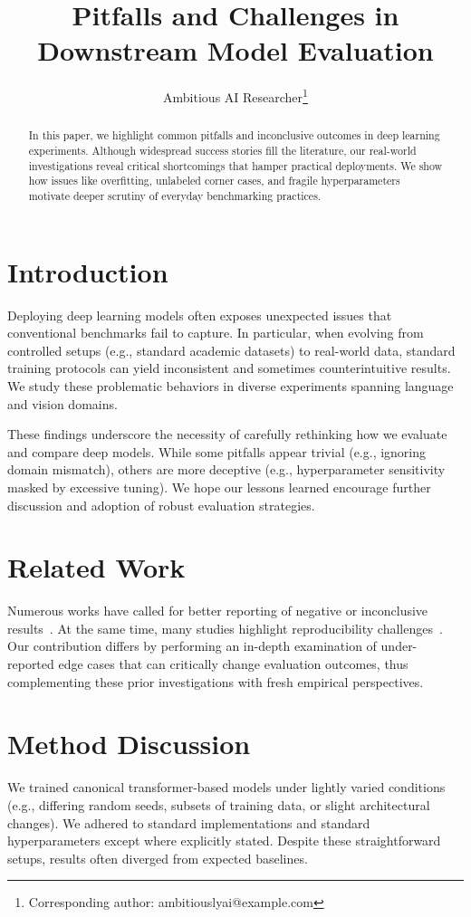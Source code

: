 \documentclass[11pt]{article}
\title{\vspace{-2em}Pitfalls and Challenges in Downstream Model Evaluation\vspace{-0.5em}}
\author{
  Ambitious AI Researcher\footnote{Corresponding author: 
  ambitiouslyai@example.com}
}
\date{}
\begin{document}
\maketitle

\begin{abstract}
In this paper, we highlight common pitfalls and inconclusive outcomes in deep learning experiments. Although widespread success stories fill the literature, our real-world investigations reveal critical shortcomings that hamper practical deployments. We show how issues like overfitting, unlabeled corner cases, and fragile hyperparameters motivate deeper scrutiny of everyday benchmarking practices.
\end{abstract}

\section{Introduction}
Deploying deep learning models often exposes unexpected issues that conventional benchmarks fail to capture. 
In particular, when evolving from controlled setups (e.g., standard academic datasets) to real-world data, standard training protocols can yield inconsistent and sometimes counterintuitive results. 
We study these problematic behaviors in diverse experiments spanning language and vision domains.

These findings underscore the necessity of carefully rethinking how we evaluate and compare deep models. While some pitfalls appear trivial (e.g., ignoring domain mismatch), others are more deceptive (e.g., hyperparameter sensitivity masked by excessive tuning). 
We hope our lessons learned encourage further discussion and adoption of robust evaluation strategies.

\section{Related Work}
Numerous works have called for better reporting of negative or inconclusive results~\citep{example1}. At the same time, many studies highlight reproducibility challenges~\citep{example2}. Our contribution differs by performing an in-depth examination of under-reported edge cases that can critically change evaluation outcomes, thus complementing these prior investigations with fresh empirical perspectives.

\section{Method Discussion}
We trained canonical transformer-based models under lightly varied conditions (e.g., differing random seeds, subsets of training data, or slight architectural changes). We adhered to standard implementations and standard hyperparameters except where explicitly stated. Despite these straightforward setups, results often diverged from expected baselines.
\end{document}
